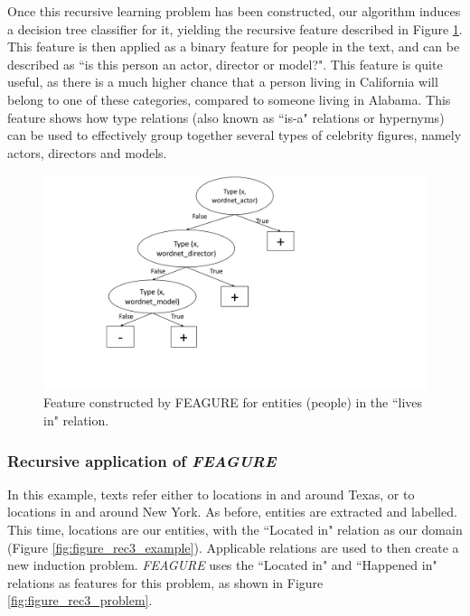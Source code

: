 \documentclass[twoside,11pt]{article}
\theoremstyle{definition}
\begin{document}
Once this recursive learning problem has been constructed, our algorithm induces a decision tree classifier for it, yielding the recursive feature described in Figure \ref{fig:figure_rec2_feature}. This feature is then applied as a binary feature for people in the text, and can be described as ``is this person an actor, director or model?".
This feature is quite useful, as there is a much higher chance that a person living in California will belong to one of these categories, compared to someone living in Alabama. This feature shows how type relations (also known as ``is-a" relations or hypernyms) can be used to effectively group together several types of celebrity figures, namely actors, directors and models.

\begin{figure}[h!]
	\centering
	\includegraphics[width=0.7\linewidth]{figure_rec2_feature_new}
	\caption{Feature constructed by FEAGURE for entities (people) in the ``lives in" relation.}
	\label{fig:figure_rec2_feature}
\end{figure}

\subsubsection{Recursive application of \emph{FEAGURE}}

In this example, texts refer either to locations in and around Texas, or to locations in and around New York. As before, entities are extracted and labelled. This time, locations are our entities, with the ``Located in" relation as our domain (Figure \ref{fig:figure_rec3_example}). Applicable relations are used to then create a new induction problem. \emph{FEAGURE} uses the ``Located in" and ``Happened in" relations as features for this problem, as shown in Figure \ref{fig:figure_rec3_problem}. 
\end{document}
